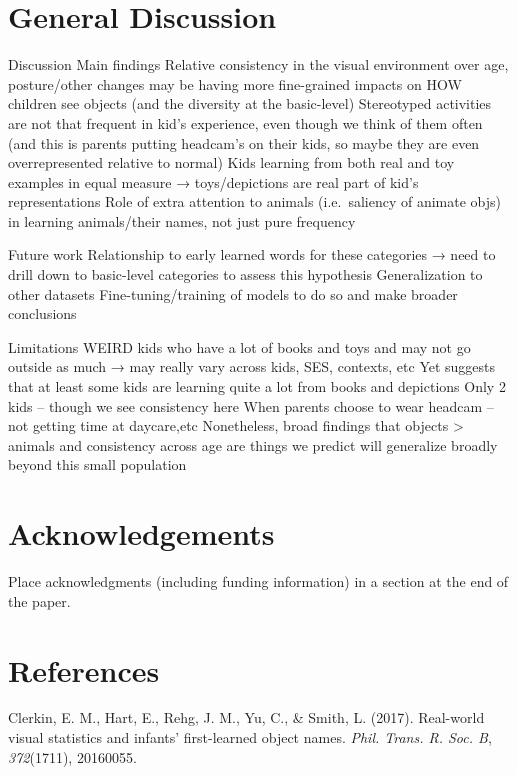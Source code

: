 \documentclass[10pt, letterpaper]{article}
\begin{document}
\section{General Discussion}\label{general-discussion}

Discussion Main findings Relative consistency in the visual environment
over age, posture/other changes may be having more fine-grained impacts
on HOW children see objects (and the diversity at the basic-level)
Stereotyped activities are not that frequent in kid's experience, even
though we think of them often (and this is parents putting headcam's on
their kids, so maybe they are even overrepresented relative to normal)
Kids learning from both real and toy examples in equal measure →
toys/depictions are real part of kid's representations Role of extra
attention to animals (i.e.~saliency of animate objs) in learning
animals/their names, not just pure frequency

Future work Relationship to early learned words for these categories →
need to drill down to basic-level categories to assess this hypothesis
Generalization to other datasets Fine-tuning/training of models to do so
and make broader conclusions

Limitations WEIRD kids who have a lot of books and toys and may not go
outside as much → may really vary across kids, SES, contexts, etc Yet
suggests that at least some kids are learning quite a lot from books and
depictions Only 2 kids -- though we see consistency here When parents
choose to wear headcam -- not getting time at daycare,etc Nonetheless,
broad findings that objects \textgreater{} animals and consistency
across age are things we predict will generalize broadly beyond this
small population

\section{Acknowledgements}\label{acknowledgements}

Place acknowledgments (including funding information) in a section at
the end of the paper.

\section{References}\label{references}

\setlength{\parindent}{-0.1in} \setlength{\leftskip}{0.125in} \noindent

\hypertarget{refs}{}
\hypertarget{ref-clerkin2017}{}
Clerkin, E. M., Hart, E., Rehg, J. M., Yu, C., \& Smith, L. (2017).
Real-world visual statistics and infants' first-learned object names.
\emph{Phil. Trans. R. Soc. B}, \emph{372}(1711), 20160055.
\end{document}
